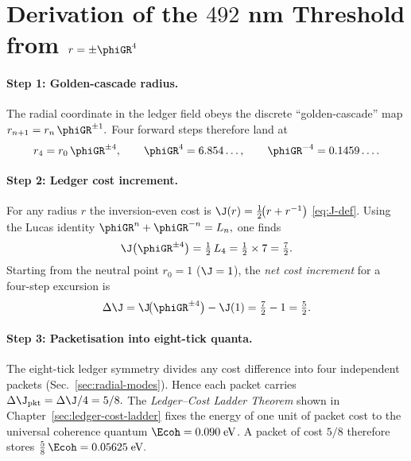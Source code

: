 \documentclass[11pt,oneside]{book}
\begin{document}
{%

\section{Derivation of the \texorpdfstring{$492$ nm}{492 nm} Threshold
           from \boldmath$r=\pm\phiGR^{4}$}
\label{sec:492-derivation}

\paragraph{Step 1: Golden-cascade radius.}
The radial coordinate in the ledger field obeys the discrete
“golden-cascade” map
\(
   r_{n+1}=r_{n}\,\phiGR^{\pm1}.
\)
Four forward steps therefore land at
\[
   r_{4}=r_{0}\,\phiGR^{\pm4},
   \qquad
   \phiGR^{4}=6.854\ldots,
   \qquad
   \phiGR^{-4}=0.1459\ldots.
\]

\paragraph{Step 2: Ledger cost increment.}
For any radius \(r\) the inversion-even cost is
\(
   \J(r)=\tfrac12\!\bigl(r+r^{-1}\bigr)
\)
\eqref{eq:J-def}.
Using the Lucas identity
\(
   \phiGR^{n}+\phiGR^{-n}=L_{n},
\)
one finds
\[
   \J\bigl(\phiGR^{\pm4}\bigr)
   =
   \tfrac12\,L_{4}
   =
   \tfrac12\times 7
   =
   \tfrac{7}{2}.
\]
Starting from the neutral point \(r_{0}=1\) (\(\J=1\)),
the \emph{net cost increment} for a four-step excursion is
\[
   \Delta\J
   =
   \J\!\bigl(\phiGR^{\pm4}\bigr) - \J(1)
   =
   \tfrac{7}{2}-1
   =
   \tfrac{5}{2}.
\]

\paragraph{Step 3: Packetisation into eight-tick quanta.}
The eight-tick ledger symmetry divides any cost difference into four
independent packets (Sec.~\ref{sec:radial-modes}).  Hence each packet
carries
\(
   \Delta\J_{\text{pkt}}=\Delta\J/4=5/8.
\)
The \emph{Ledger–Cost Ladder Theorem} shown in
Chapter~\ref{sec:ledger-cost-ladder}
fixes the energy of one unit of packet cost to the universal coherence
quantum \(\Ecoh=0.090\;\text{eV}\).  A packet of cost
\(5/8\) therefore stores
\(
   \tfrac58\,\Ecoh = 0.05625\;\text{eV}.
\)

}
\end{document}
